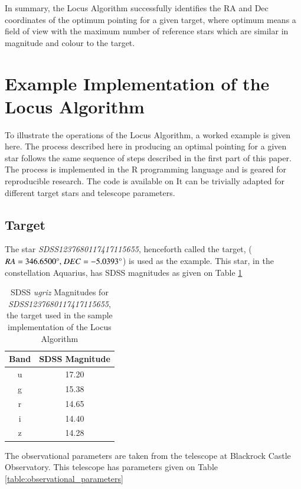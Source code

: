 \documentclass{aa}
\begin{document}
In summary, the Locus Algorithm successfully identifies the RA and Dec
coordinates of the optimum pointing for a given target, where optimum
means a field of view with the maximum number of reference stars which
are similar in magnitude and colour to the target.


\section{Example Implementation of the Locus Algorithm}
\label{example-implementation-of-the-locus-algorithm}

To illustrate the operations of the Locus Algorithm, a worked example is
given here. The process described here in producing an optimal pointing
for a given star follows the same sequence of steps described in the
first part of this paper. The process is implemented in the R
programming language and is geared for reproducible research. The code
is available on \citet{githubrepo}
It can be trivially adapted for different target stars and telescope
parameters.


\subsection{Target}
\label{target}

The star \textit{SDSS1237680117417115655}, henceforth called the target,
(${RA = 346.6500\degree,}\ {DEC = -5.0393\degree}$) is used as the example. This star, in
the constellation Aquarius, has SDSS magnitudes as given on Table \ref{table:target_mags}

\begin{table}[!htb]
\centering
\begin{tabular}{cc}
\hline\hline
Band & SDSS Magnitude\\
\hline
u & 17.20\\
g & 15.38\\
r & 14.65\\
i & 14.40\\
z & 14.28\\
\hline
\end{tabular}
 \caption{SDSS \textit{ugriz} Magnitudes for \textit{SDSS1237680117417115655}, the target used in the sample implementation of the Locus Algorithm}
 \label{table:target_mags} 
\end{table}

The observational parameters are taken from the telescope at
Blackrock Castle Observatory. This telescope has
parameters given on Table \ref{table:observational_parameters}
\end{document}
